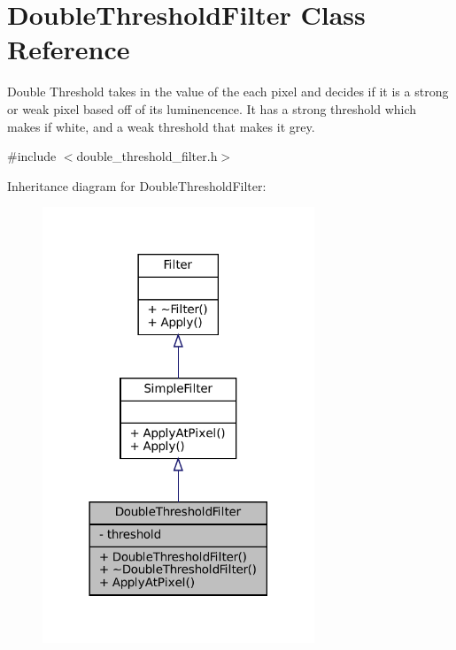 \hypertarget{classDoubleThresholdFilter}{}\section{Double\+Threshold\+Filter Class Reference}
\label{classDoubleThresholdFilter}


Double Threshold takes in the value of the each pixel and decides if it is a strong or weak pixel based off of its luminencence. It has a strong threshold which makes if white, and a weak threshold that makes it grey.  




{\ttfamily \#include $<$double\+\_\+threshold\+\_\+filter.\+h$>$}



Inheritance diagram for Double\+Threshold\+Filter\+:\nopagebreak
\begin{figure}[H]
\begin{center}
\leavevmode
\includegraphics[width=230pt]{classDoubleThresholdFilter__inherit__graph}
\end{center}
\end{figure}


